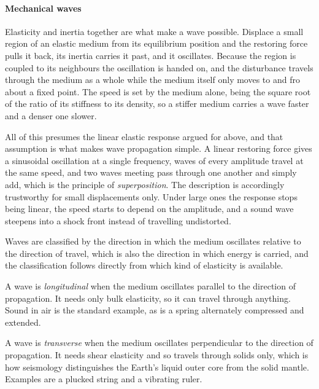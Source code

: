     \paragraph{Mechanical waves}

        Elasticity and inertia together are what make a wave possible. Displace a small region of an elastic medium from its equilibrium position and the restoring force pulls it back, its inertia carries it past, and it oscillates. Because the region is coupled to its neighbours the oscillation is handed on, and the disturbance travels through the medium as a whole while the medium itself only moves to and fro about a fixed point. The speed is set by the medium alone, being the square root of the ratio of its stiffness to its density, so a stiffer medium carries a wave faster and a denser one slower.

        All of this presumes the linear elastic response argued for above, and that assumption is what makes wave propagation simple. A linear restoring force gives a sinusoidal oscillation at a single frequency, waves of every amplitude travel at the same speed, and two waves meeting pass through one another and simply add, which is the principle of \emph{superposition}. The description is accordingly trustworthy for small displacements only. Under large ones the response stops being linear, the speed starts to depend on the amplitude, and a sound wave steepens into a shock front instead of travelling undistorted.

        Waves are classified by the direction in which the medium oscillates relative to the direction of travel, which is also the direction in which energy is carried, and the classification follows directly from which kind of elasticity is available.

        A wave is \emph{longitudinal} when the medium oscillates parallel to the direction of propagation. It needs only bulk elasticity, so it can travel through anything. Sound in air is the standard example, as is a spring alternately compressed and extended.

        A wave is \emph{transverse} when the medium oscillates perpendicular to the direction of propagation. It needs shear elasticity and so travels through solids only, which is how seismology distinguishes the Earth's liquid outer core from the solid mantle. Examples are a plucked string and a vibrating ruler.